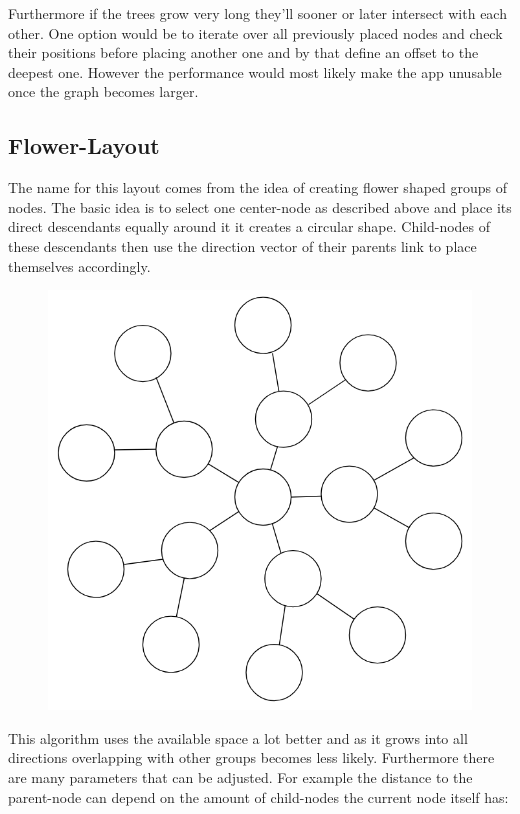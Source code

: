Furthermore if the trees grow very long they'll sooner or later intersect with each other. One option would be to iterate over all previously placed nodes and check their positions before placing another one and by that define an offset to the deepest one. However the performance would most likely make the app unusable once the graph becomes larger.

\subsection{Flower-Layout}
The name for this layout comes from the idea of creating flower shaped groups of nodes. The basic idea is to select one center-node as described above and place its direct descendants equally around it it creates a circular shape. Child-nodes of these descendants then use the direction vector of their parents link to place themselves accordingly.

\begin{figure}[H]
\centering
\includegraphics[scale=.55]{Bilder/FlowerEx.png}
\end{figure}

This algorithm uses the available space a lot better and as it grows into all directions overlapping with other groups becomes less likely. Furthermore there are many parameters that can be adjusted. For example the distance to the parent-node can depend on the amount of child-nodes the current node itself has:

